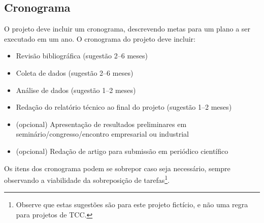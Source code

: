 \documentclass[a4paper]{article}
\begin{document}
\subsection{Cronograma}

O projeto deve incluir um cronograma, descrevendo metas para um plano
a ser executado em um ano.
O cronograma do projeto deve incluir:

\begin{itemize}
\item Revisão bibliográfica (sugestão 2--6 meses)
\item Coleta de dados (sugestão 2--6 meses)
\item Análise de dados (sugestão 1--2 meses)
\item Redação do relatório técnico ao final do projeto (sugestão 1--2 meses)
\item (opcional) Apresentação de resultados preliminares em seminário/congresso/encontro empresarial ou industrial
\item (opcional) Redação de artigo para submissão em periódico científico
\end{itemize}

Os itens dos cronograma podem se sobrepor caso seja necessário, sempre
observando a viabilidade da sobreposição de tarefas\footnote{Observe
  que estas sugestões são para este projeto fictício, e não uma regra
  para projetos de TCC.}.




\end{document}
